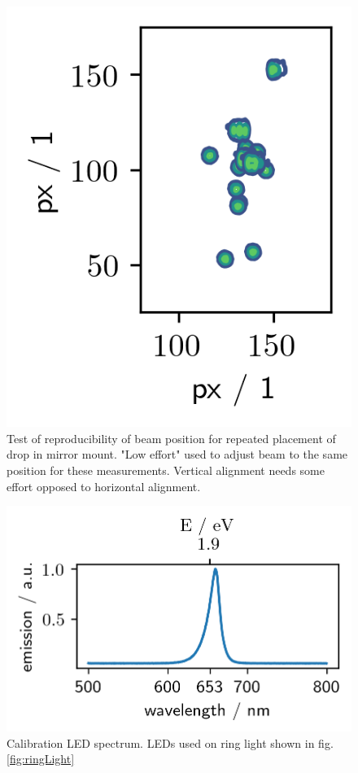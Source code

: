 \documentclass[twoside,openright,listof=numbered]{scrreprt}
\begin{document}
\begin{figure}[hbtp]
\centering
\includegraphics[scale=1]{images/DropinMirrorStudy.png}
\caption[Test of reproducibility of beam position for repeated placement of drop in mirror mount.]{Test of reproducibility of beam position for repeated placement of drop in mirror mount. "Low effort" used to adjust beam to the same position for these measurements. Vertical alignment needs some effort opposed to horizontal alignment.\label{fig:DropinStudy}}
\end{figure}

\begin{figure}[hbtp]
\centering
\includegraphics[scale=1]{images/spectra/LEDspectrum.png}
\caption{Calibration LED spectrum. LEDs used on ring light shown in fig. \ref{fig:ringLight}\label{fig:calibLEDspectrum}}
\end{figure}
\end{document}
